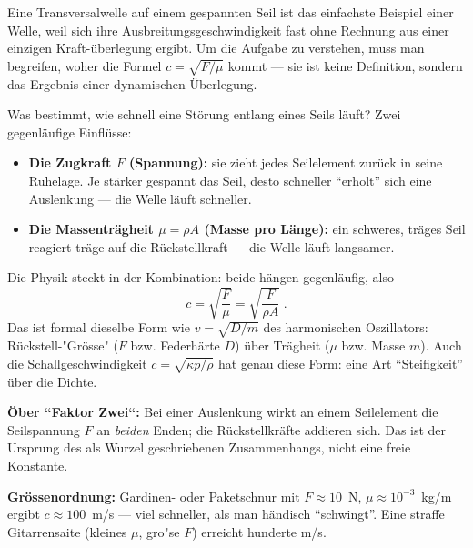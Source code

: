 

Eine Transversalwelle auf einem gespannten Seil ist das einfachste Beispiel
einer Welle, weil sich ihre Ausbreitungsgeschwindigkeit fast ohne Rechnung
aus einer einzigen Kraft-überlegung ergibt. Um die Aufgabe zu verstehen,
muss man begreifen, woher die Formel $c=\sqrt{F/\mu}$ kommt --- sie ist keine
Definition, sondern das Ergebnis einer dynamischen Überlegung.

\begin{werkzeugkasten}[Warum $c=\sqrt{F/\mu}$? Längsspannung und Trägheit]
Was bestimmt, wie schnell eine Störung entlang eines Seils läuft? Zwei
gegenläufige Einflüsse:

\begin{itemize}
  \item \textbf{Die Zugkraft $F$ (Spannung):} sie zieht jedes Seilelement
        zurück in seine Ruhelage. Je stärker gespannt das Seil, desto
        schneller ``erholt'' sich eine Auslenkung --- die Welle läuft
        schneller.
  \item \textbf{Die Massenträgheit $\mu=\rho A$ (Masse pro Länge):} ein
        schweres, träges Seil reagiert träge auf die Rückstellkraft --- die
        Welle läuft langsamer.
\end{itemize}

Die Physik steckt in der Kombination: beide hängen gegenläufig, also
\begin{equation}
  c=\sqrt{\frac{F}{\mu}}=\sqrt{\frac{F}{\rho A}}\;.
\end{equation}
Das ist formal dieselbe Form wie $v=\sqrt{D/m}$ des harmonischen Oszillators:
Rückstell-"Grösse" ($F$ bzw. Federhärte $D$) über Trägheit ($\mu$ bzw.
Masse $m$). Auch die Schallgeschwindigkeit $c=\sqrt{\kappa p/\rho}$ hat
genau diese Form: eine Art ``Steifigkeit'' über die Dichte.

\textbf{\"Ober ``Faktor Zwei``:} Bei einer Auslenkung wirkt an einem
Seilelement die Seilspannung $F$ an \emph{beiden} Enden; die Rückstellkräfte
addieren sich. Das ist der Ursprung des als Wurzel geschriebenen
Zusammenhangs, nicht eine freie Konstante.

\textbf{Grössenordnung:} Gardinen- oder Paketschnur mit $F\approx10$~N,
$\mu\approx10^{-3}$~kg/m ergibt $c\approx100$~m/s --- viel schneller, als man
händisch ``schwingt''. Eine straffe Gitarrensaite (kleines $\mu$, gro"se $F$)
erreicht hunderte m/s.
\end{werkzeugkasten}

